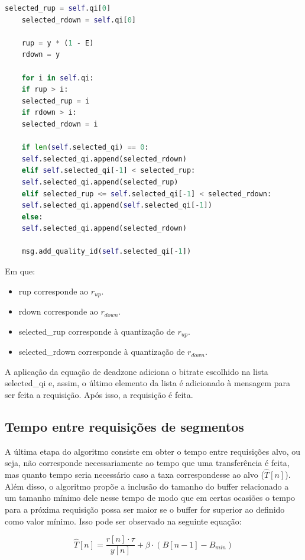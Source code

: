 \documentclass[10pt,twocolumn,letterpaper]{article}
\begin{document}
\begin{lstlisting}[language=python]
	selected_rup = self.qi[0]
	selected_rdown = self.qi[0]
	
	rup = y * (1 - E)
	rdown = y
	
	for i in self.qi:
	if rup > i:
	selected_rup = i
	if rdown > i:
	selected_rdown = i
	
	if len(self.selected_qi) == 0:
	self.selected_qi.append(selected_rdown)
	elif self.selected_qi[-1] < selected_rup:
	self.selected_qi.append(selected_rup)
	elif selected_rup <= self.selected_qi[-1] < selected_rdown:
	self.selected_qi.append(self.selected_qi[-1])
	else:
	self.selected_qi.append(selected_rdown)
	
	msg.add_quality_id(self.selected_qi[-1])
\end{lstlisting}

Em que:
\begin{itemize}
	\item rup corresponde ao $r_{up}$.
	\item rdown corresponde ao $r_{down}$.
	\item selected\_rup corresponde à quantização de $r_{up}$.
	\item selected\_rdown corresponde à quantização de $r_{down}$.
\end{itemize}

A aplicação da equação de deadzone adiciona o bitrate escolhido na lista selected\_qi e, assim, o último elemento da lista é adicionado à mensagem para ser feita a requisição. Após isso, a requisição é feita.

\subsection{Tempo entre requisições de segmentos}
A última etapa do algoritmo consiste em obter o tempo entre requisições alvo, ou seja, não corresponde necessariamente ao tempo que uma transferência é feita, mas quanto tempo seria necessário caso a taxa correspondesse ao alvo ($\hat{T}[n]$). Além disso, o algoritmo propõe a inclusão do tamanho do buffer relacionado a um tamanho mínimo dele nesse tempo de modo que em certas ocasiões o tempo para a próxima requisição possa ser maior se o buffer for superior ao definido como valor mínimo. Isso pode ser observado na seguinte equação:

\begin{equation}
	\hat{T}[n] = \frac{r[n] \cdot \tau}{y[n]} + \beta \cdot (B[n-1] - B_{min})
\end{equation}
\end{document}
